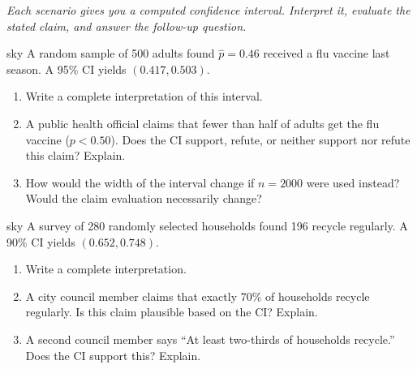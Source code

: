 \documentclass[10pt]{article}
\begin{document}
\namepartnerperiod

\vspace{0.15in}

\textit{Each scenario gives you a computed confidence interval. Interpret it, evaluate the
stated claim, and answer the follow-up question.}

\begin{scenariobox}{sky}
A random sample of 500 adults found $\hat p = 0.46$ received a flu vaccine last season.
A 95\% CI yields $(0.417, 0.503)$.

\begin{enumerate}[label=\alph*.]
  \item Write a complete interpretation of this interval.

  \item A public health official claims that fewer than half of adults get the flu vaccine
        ($p < 0.50$). Does the CI support, refute, or neither support nor refute this claim?
        Explain.

  \item How would the width of the interval change if $n = 2000$ were used instead? Would
        the claim evaluation necessarily change?
\end{enumerate}
\end{scenariobox}

\begin{scenariobox}{sky}
A survey of 280 randomly selected households found 196 recycle regularly. A 90\% CI
yields $(0.652, 0.748)$.

\begin{enumerate}[label=\alph*.]
  \item Write a complete interpretation.

  \item A city council member claims that exactly 70\% of households recycle regularly.
        Is this claim plausible based on the CI? Explain.

  \item A second council member says ``At least two-thirds of households recycle.''
        Does the CI support this? Explain.
\end{enumerate}
\end{scenariobox}
\end{document}
